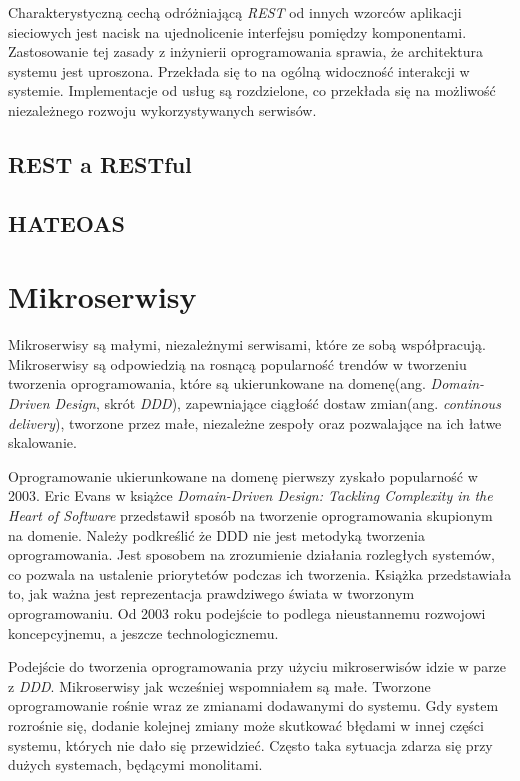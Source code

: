 Charakterystyczną cechą odróżniającą \textsl{REST} od innych wzorców aplikacji sieciowych jest nacisk na ujednolicenie interfejsu pomiędzy komponentami. Zastosowanie tej zasady z inżynierii oprogramowania sprawia, że architektura systemu jest uproszona. Przekłada się to na ogólną widoczność interakcji w systemie. Implementacje od usług są rozdzielone, co przekłada się na możliwość niezależnego rozwoju wykorzystywanych serwisów.

\subsection{REST a RESTful}
\subsection{HATEOAS}
\section{Mikroserwisy}
Mikroserwisy są małymi, niezależnymi serwisami, które ze sobą współpracują\cite{newman}. Mikroserwisy są odpowiedzią na rosnącą popularność trendów w tworzeniu tworzenia oprogramowania, które są ukierunkowane na domenę(ang. \textsl{Domain-Driven Design}, skrót \textsl{DDD}), zapewniające ciągłość dostaw zmian(ang. \textsl{continous delivery}), tworzone przez małe, niezależne zespoły oraz pozwalające na ich łatwe skalowanie. 

Oprogramowanie ukierunkowane na domenę pierwszy zyskało popularność w 2003. Eric Evans w książce \textsl{Domain-Driven Design: Tackling Complexity in the Heart of Software}\cite{ddd} przedstawił sposób na tworzenie oprogramowania skupionym na domenie. Należy podkreślić że DDD nie jest metodyką tworzenia oprogramowania. Jest sposobem na zrozumienie działania rozległych systemów, co pozwala na ustalenie priorytetów podczas ich tworzenia. Książka przedstawiała to, jak ważna jest reprezentacja prawdziwego świata w tworzonym oprogramowaniu. Od 2003 roku podejście to podlega nieustannemu rozwojowi koncepcyjnemu, a jeszcze technologicznemu.

Podejście do tworzenia oprogramowania przy użyciu mikroserwisów idzie w parze z \textsl{DDD}. Mikroserwisy jak wcześniej wspomniałem są małe. Tworzone oprogramowanie rośnie wraz ze zmianami dodawanymi do systemu. Gdy system rozrośnie się, dodanie kolejnej zmiany może skutkować błędami w innej części systemu, których nie dało się przewidzieć. Często taka sytuacja zdarza się przy dużych systemach, będącymi monolitami.

